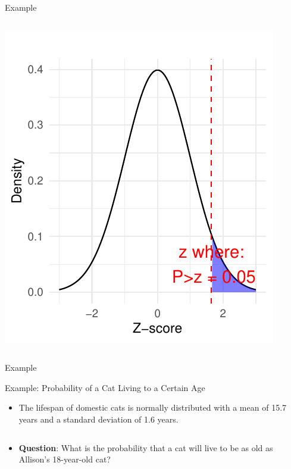 \documentclass[
  ignorenonframetext,
]{beamer}
\providecommand{\tightlist}{%
  \setlength{\itemsep}{0pt}\setlength{\parskip}{0pt}}
\begin{document}
\begin{frame}[fragile]{Example}
\begin{columns}[T]
\begin{column}{0.5\textwidth}
\includegraphics{M5-Hypothesis-Testing,-Probability-and-Distribution_files/figure-beamer/unnamed-chunk-20-1.pdf}
\end{column}
\end{columns}
\end{frame}

\begin{frame}{Example}
\label{example-5}
\end{frame}

\begin{frame}{Example: Probability of a Cat Living to a Certain Age}
\label{example-probability-of-a-cat-living-to-a-certain-age}
\begin{itemize}
\tightlist
\item
  The lifespan of domestic cats is normally distributed with a mean of
  15.7 years and a standard deviation of 1.6 years.
\end{itemize}

\begin{columns}[T]
\begin{column}{0.48\textwidth}
\vspace{1cm}

\begin{itemize}
\tightlist
\item
  \textbf{Question}: What is the probability that a cat will live to be
  as old as Allison's 18-year-old cat?
\end{itemize}
\end{column}

\begin{column}{0.48\textwidth}
\end{column}
\end{columns}
\end{frame}
\end{document}
